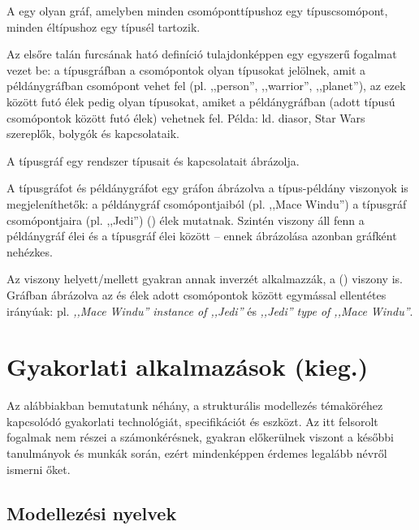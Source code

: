 \begin{definicio}
A  egy olyan gráf, amelyben minden csomóponttípushoz egy típuscsomópont, minden éltípushoz egy típusél tartozik.
\end{definicio}

Az elsőre talán furcsának ható definíció tulajdonképpen egy egyszerű fogalmat vezet be: a típusgráfban a csomópontok olyan típusokat jelölnek, amit a példánygráfban csomópont vehet fel (pl. ,,person'', ,,warrior'', ,,planet''), az ezek között futó élek pedig olyan típusokat, amiket a példánygráfban (adott típusú csomópontok között futó élek) vehetnek fel. Példa: ld. diasor, Star Wars szereplők, bolygók és kapcsolataik.

A típusgráf egy rendszer  típusait és kapcsolatait ábrázolja.

A típusgráfot és példánygráfot egy gráfon ábrázolva a típus-példány viszonyok is megjeleníthetők: a példánygráf csomópontjaiból (pl. ,,Mace Windu'') a típusgráf csomópontjaira (pl. ,,Jedi'')  () élek mutatnak. Szintén  viszony áll fenn a példánygráf élei és a típusgráf élei között -- ennek ábrázolása azonban gráfként nehézkes.

Az  viszony helyett/mellett gyakran annak inverzét alkalmazzák, a  () viszony is. Gráfban ábrázolva az  és  élek adott csomópontok között egymással ellentétes irányúak: pl. \emph{,,Mace Windu'' instance of ,,Jedi''} és \emph{,,Jedi'' type of ,,Mace Windu''}.


\section{Gyakorlati alkalmazások (kieg.)}

Az alábbiakban bemutatunk néhány, a strukturális modellezés témaköréhez kapcsolódó gyakorlati technológiát, specifikációt és eszközt. Az itt felsorolt fogalmak nem részei a számonkérésnek, gyakran előkerülnek viszont a későbbi tanulmányok és munkák során, ezért mindenképpen érdemes legalább névről ismerni őket.

\subsection{Modellezési nyelvek}

